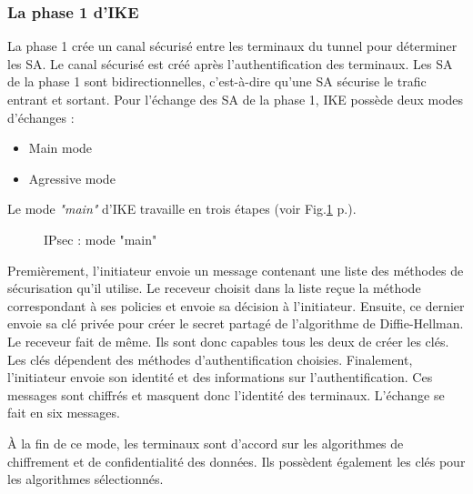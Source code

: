 \subsubsection{La phase 1 d'IKE}
La phase 1 crée un canal sécurisé entre les terminaux du tunnel pour déterminer les SA. Le canal sécurisé est créé après l'authentification des terminaux. Les SA de la phase 1 sont bidirectionnelles, c'est-à-dire qu'une SA sécurise le trafic entrant et sortant. 
Pour l'échange des SA de la phase 1, IKE possède deux modes d'échanges : 
\begin{itemize}
	\item Main mode
	\item Agressive mode
\end{itemize}
Le mode \textit{"main"} d'IKE travaille en trois étapes (voir Fig.\ref{fig:ipsmain} p.\pageref{fig:ipsmain}). 
\begin{figure}[ht]
\centering
{}
\caption{IPsec : mode "main"}
\label{fig:ipsmain}
\end{figure}
Premièrement, l'initiateur envoie un message contenant une liste des méthodes de sécurisation qu'il utilise. 
Le receveur choisit dans la liste reçue la méthode correspondant à ses policies et envoie sa décision à l'initiateur. 
Ensuite, ce dernier envoie sa clé privée pour créer le secret partagé de l'algorithme de Diffie-Hellman. 
Le receveur fait de même. Ils sont donc capables tous les deux de créer les clés. 
Les clés dépendent des méthodes d'authentification choisies. 
Finalement, l'initiateur envoie son identité et des informations sur l'authentification. 
Ces messages sont chiffrés et masquent donc l'identité des terminaux. 
L'échange se fait en six messages.

À la fin de ce mode, les terminaux sont d'accord sur les algorithmes de chiffrement et de confidentialité des données. 
Ils possèdent également les clés pour les algorithmes sélectionnés. 

